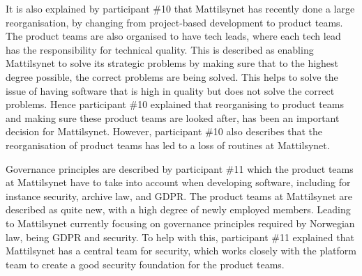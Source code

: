 

It is also explained by participant \#10 that Mattilsynet has recently done a large reorganisation, by changing from project-based development to product teams. The product teams are also organised to have tech leads, where each tech lead has the responsibility for technical quality. This is described as enabling Mattilsynet to solve its strategic problems by making sure that to the highest degree possible, the correct problems are being solved. This helps to solve the issue of having software that is high in quality but does not solve the correct problems. Hence participant \#10 explained that reorganising to product teams and making sure these product teams are looked after, has been an important decision for Mattilsynet. However, participant \#10 also describes that the reorganisation of product teams has led to a loss of routines at Mattilsynet.


Governance principles are described by participant \#11 which the product teams at Mattilsynet have to take into account when developing software, including for instance security, archive law, and GDPR. The product teams at Mattilsynet are described as quite new, with a high degree of newly employed members. Leading to Mattilsynet currently focusing on governance principles required by Norwegian law, being GDPR and security. To help with this, participant \#11 explained that Mattilsynet has a central team for security, which works closely with the platform team to create a good security foundation for the product teams.

